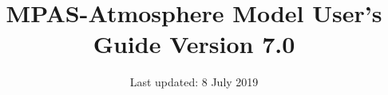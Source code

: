 \documentclass[11pt]{report}
\newcommand{\version}{7.0}
\begin{document}
\title{\bf \hfil MPAS-Atmosphere Model User's Guide \hfil \break \hfil \break Version \version}
\date{Last updated: 8 July 2019}


\maketitle



\tableofcontents











\appendix






\end{document}
